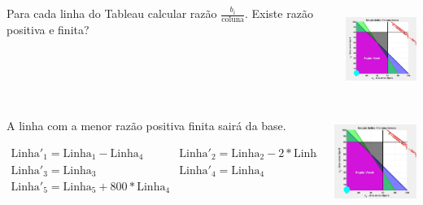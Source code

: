 \begin{frame}
{\begin{columns}
\begin{column}{0.5\textwidth}
		\end{column}
	\end{columns}	
	}
	{
	\begin{columns}
		\begin{column}{0.5\textwidth}
			\centering
			\begin{mdframed}[backgroundcolor=orange!80]
				Para cada linha do Tableau calcular razão $\frac{b_i}{\text{coluna}}$. Existe razão positiva e finita?
			\end{mdframed}
		\end{column}
		\begin{column}{0.5\textwidth}
			\centering
			\includegraphics[width=2.8cm,height=2.8cm]{Exaustiva_2.jpeg}
		\end{column}
	\end{columns}	
	}
	\only<4>
	{
	\begin{columns}
		\begin{column}{0.5\textwidth}
			\centering
			\begin{mdframed}[backgroundcolor=olive!80]
				A linha com a menor razão positiva finita sairá da base.
			\end{mdframed}
			$
				\begin{matrix}
					\scriptstyle \text{Linha}'_1 = \text{Linha}_1 - \text{Linha}_4 &  
					\scriptstyle \text{Linha}'_2 = \text{Linha}_2 - 2*\text{Linha}_4 \\  
					\scriptstyle \text{Linha}'_3 = \text{Linha}_3  &  
					\scriptstyle \text{Linha}'_4 = \text{Linha}_4 \\  
					\scriptstyle \text{Linha}'_5 = \text{Linha}_5 + 800*\text{Linha}_4 & \\
				\end{matrix}
			$
		\end{column}
		\begin{column}{0.5\textwidth}
			\centering
			\includegraphics[width=2.8cm,height=2.8cm]{Exaustiva_2.jpeg}

\end{column}
\end{columns}}
\end{frame}
